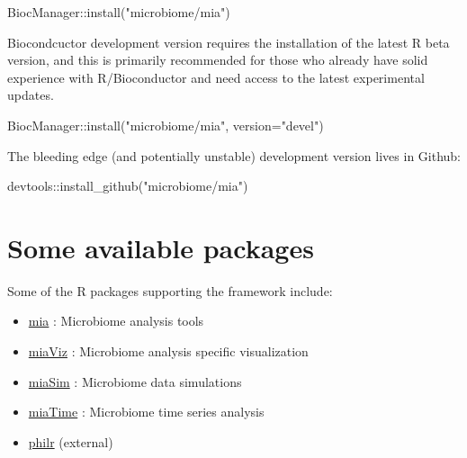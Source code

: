 \documentclass[
]{book}
\newenvironment{Shaded}{\begin{snugshade}}{\end{snugshade}}
\newcommand{\AttributeTok}[1]{\textcolor[rgb]{0.77,0.63,0.00}{#1}}
\newcommand{\FunctionTok}[1]{\textcolor[rgb]{0.00,0.00,0.00}{#1}}
\newcommand{\NormalTok}[1]{#1}
\newcommand{\SpecialCharTok}[1]{\textcolor[rgb]{0.00,0.00,0.00}{#1}}
\newcommand{\StringTok}[1]{\textcolor[rgb]{0.31,0.60,0.02}{#1}}
\providecommand{\tightlist}{%
  \setlength{\itemsep}{0pt}\setlength{\parskip}{0pt}}
\begin{document}
\begin{Shaded}
\begin{Highlighting}[]
\NormalTok{BiocManager}\SpecialCharTok{::}\FunctionTok{install}\NormalTok{(}\StringTok{"microbiome/mia"}\NormalTok{)}
\end{Highlighting}
\end{Shaded}

Biocondcuctor development version requires the installation of the
latest R beta version, and this is primarily recommended for those who
already have solid experience with R/Bioconductor and need access to
the latest experimental updates.

\begin{Shaded}
\begin{Highlighting}[]
\NormalTok{BiocManager}\SpecialCharTok{::}\FunctionTok{install}\NormalTok{(}\StringTok{"microbiome/mia"}\NormalTok{, }\AttributeTok{version=}\StringTok{"devel"}\NormalTok{)}
\end{Highlighting}
\end{Shaded}

The bleeding edge (and potentially unstable) development version lives
in Github:

\begin{Shaded}
\begin{Highlighting}[]
\NormalTok{devtools}\SpecialCharTok{::}\FunctionTok{install\_github}\NormalTok{(}\StringTok{"microbiome/mia"}\NormalTok{)}
\end{Highlighting}
\end{Shaded}

\hypertarget{some-available-packages}{%
\section{Some available packages}\label{some-available-packages}}

Some of the R packages supporting the framework include:

\begin{itemize}
\tightlist
\item
  \href{microbiome.github.io/mia}{mia} : Microbiome analysis tools\\
\item
  \href{microbiome.github.io/miaViz}{miaViz} : Microbiome analysis specific visualization
\item
  \href{microbiome.github.io/miaSim}{miaSim} : Microbiome data simulations
\item
  \href{microbiome.github.io/miaTime}{miaTime} : Microbiome time series analysis
\item
  \href{http://bioconductor.org/packages/devel/bioc/html/philr.html}{philr} (external)
\end{itemize}
\end{document}
